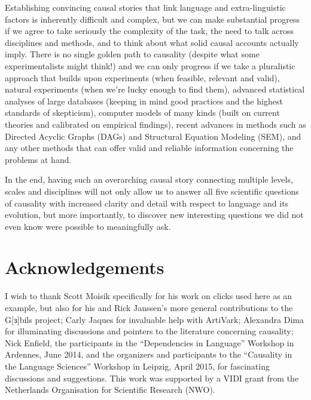 \documentclass[output=paper]{langsci/langscibook}
\begin{document}
Establishing convincing causal stories that link language and extra-linguistic factors is inherently difficult and complex, but we can make substantial progress if we agree to take seriously the complexity of the task, the need to talk across disciplines and methods, and to think about what solid causal accounts actually imply. There is no single golden path to causality (despite what some experimentalists might think!) and we can only progress if we take a pluralistic approach that builds upon experiments (when feasible, relevant and valid), natural experiments (when we're lucky enough to find them), advanced statistical analyses of large databases (keeping in mind good practices and the highest standards of skepticism), computer models of many kinds (built on current theories and calibrated on empirical findings), recent advances in methods such as Directed Acyclic Graphs (DAGs) and Structural Equation Modeling (SEM), and any other methods that can offer valid and reliable information concerning the problems at hand.

In the end, having such an overarching causal story connecting multiple levels, scales and disciplines will not only allow us to answer all five scientific questions of causality with increased clarity and detail with respect to language and its evolution, but more importantly, to discover new interesting questions we did not even know were possible to meaningfully ask.
 
\section*{Acknowledgements} 
I wish to thank Scott Moisik specifically for his work on clicks used here as an example, but also for his and Rick Janssen's more general contributions to the G[ɜ]bils project; Carly Jaques for invaluable help with ArtiVark; Alexandra Dima for illuminating discussions and pointers to the literature concerning causality; Nick Enfield, the participants in the “Dependencies in Language” Workshop in Ardennes, June 2014, and the organizers and participants to the “Causality in the Language Sciences” Workshop in Leipzig, April 2015, for fascinating discussions and suggestions. This work was supported by a VIDI grant from the Netherlands Organisation for Scientific Research (NWO).

\newpage 

{\sloppy
\printbibliography[heading=subbibliography,notkeyword=this]
}
\end{document}
